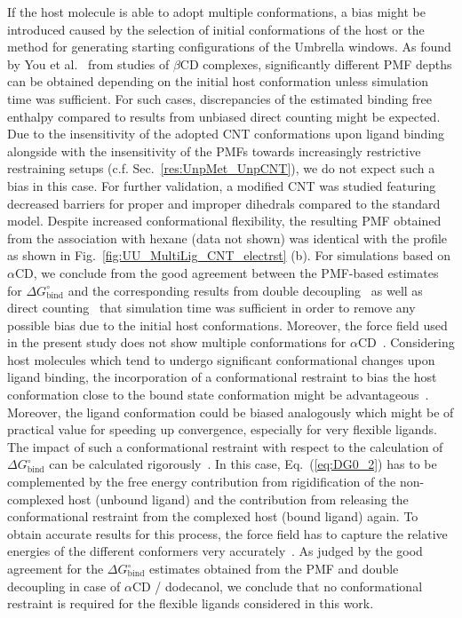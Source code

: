 \documentclass[9pt,lessons]{livecoms}
\begin{document}
If the host molecule is able to adopt multiple conformations, a bias might be introduced caused by the selection of initial conformations of the host or the method for generating starting configurations of the Umbrella windows. 
As found by You et al.~\cite{you2019potential}  
from studies of $\beta$CD complexes, significantly different PMF depths can be obtained depending on the initial host conformation unless simulation time was sufficient.
For such cases, discrepancies of the estimated binding free enthalpy compared to results from unbiased direct counting might be expected.
Due to the insensitivity of the adopted CNT conformations upon ligand binding alongside with the insensitivity of the PMFs towards increasingly restrictive restraining setups (c.f. Sec.~\ref{res:UnpMet_UnpCNT}),  
we do not expect such a bias in this case.
For further validation, a modified CNT was studied featuring decreased barriers for proper and improper dihedrals  compared to the standard model. 
Despite increased conformational flexibility, the resulting PMF obtained from the association with hexane (data not shown) was identical with the profile as shown in Fig.~\ref{fig:UU_MultiLig_CNT_electrst} (b).
For simulations based on  $\alpha$CD, we conclude from the good agreement between the PMF-based estimates for $\Delta G^\circ_\mathrm{bind}$ and the corresponding results from 
double decoupling~\cite{markthaler2017molecular, gebhardt2016calculation}
as well as direct counting~\cite{baz2018insights} that simulation time was sufficient in order to remove any possible bias due to the initial host conformations.
Moreover, the force field used in the present study does not show multiple conformations for $\alpha$CD~\cite{gebhardt2018validation}.
Considering host molecules which tend to undergo significant conformational changes upon ligand binding, the incorporation of a conformational restraint to bias the host conformation close to the bound state conformation might be advantageous~\cite{woo2005calculation}.
Moreover, the ligand conformation could be biased analogously which might be of practical value for speeding up convergence, especially for very flexible ligands.
The impact of such a conformational restraint with respect to the calculation of $\Delta G^\circ_\mathrm{bind}$ can be calculated rigorously~\cite{woo2005calculation}. 
In this case, Eq.~(\ref{eq:DG0_2}) has to be complemented by the free energy contribution from rigidification of the non-complexed host (unbound ligand) and 
the contribution from releasing the conformational restraint from the complexed host (bound ligand) again. 
To obtain accurate results for this process, the force field has to capture the relative energies of the different conformers very accurately~\cite{tirado2006contribution}.
As judged by the good agreement for the $\Delta G^\circ_\mathrm{bind}$ estimates obtained from the PMF and double decoupling in case of $\alpha$CD / dodecanol, 
we conclude that no conformational restraint is required for the flexible ligands considered in this work.
\end{document}
